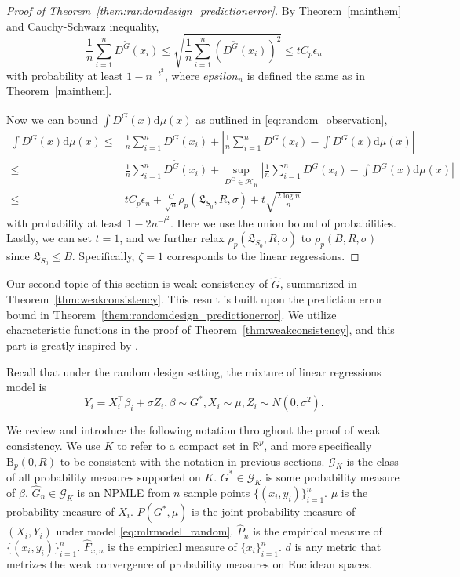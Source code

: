 \documentclass[11pt]{article}
\numberwithin{equation}{section}
\newcommand{\RS}{\mathbb{R}}
\newcommand{\T}{ \top }
\newcommand{\ball}{\mathrm{B}}
\newcommand{\errrd}{\rho}
\newcommand{\lipsz}{\mathfrak{L}}
\begin{document}
\begin{appendices}
\begin{proof}[Proof of Theorem~\ref{them:randomdesign_predictionerror}]
By Theorem~\ref{mainthem} and Cauchy-Schwarz inequality,
\begin{equation}
\frac{1}{n} \sum_{i=1}^nD^{\tilde{G}}(x_i) \leq \sqrt{\frac{1}{n} \sum_{i=1}^n(D^{\tilde{G}}(x_i))^2} \leq tC_p\epsilon_n
\label{eq:mainthm_sqrt}
\end{equation}
with probability at least $1-n^{-t^2}$, where $epsilon_n$ is defined the same as in Theorem~\ref{mainthem}.

Now we can bound $\int D^{\tilde{G}}(x) \mathrm{d} \mu(x)$ as outlined in \eqref{eq:random_observation},
\[
\begin{split}
\int D^{\tilde{G}}(x) \mathrm{d} \mu(x) \leq & \frac{1}{n} \sum_{i=1}^nD^{\tilde{G}}(x_i) + \left| \frac{1}{n} \sum_{i=1}^n D^{\tilde{G}}(x_i) - \int D^{\tilde{G}}(x) \mathrm{d} \mu(x)\right|\\
\leq  &\frac{1}{n} \sum_{i=1}^nD^{\tilde{G}}(x_i) + \sup_{D^G \in \mathcal{H}_R} \left| \frac{1}{n} \sum_{i=1}^n D^G(x_i) - \int D^G(x) \mathrm{d} \mu(x)\right|\\
\leq & t C_p \epsilon_n + \frac{C}{\sqrt{n}} \errrd_p(\lipsz_{S_0},R,\sigma) + t\sqrt{\frac{2\log n}{n}}
\end{split}
\]
with probability at least $1-2n^{-t^2}$. Here we use the union bound of probabilities. Lastly, we can set $t=1$, and we further relax  $\errrd_p(\lipsz_{S_0},R,\sigma)$ to  $\errrd_p(B,R,\sigma)$ since $\lipsz_{S_0} \leq B$. Specifically, $\zeta = 1$ corresponds to the linear regressions.
\end{proof}


Our second topic of this section is weak consistency of $\hat{G}$, summarized in Theorem~\ref{thm:weakconsistency}. This result is built upon the prediction error bound in Theorem~\ref{them:randomdesign_predictionerror}. We utilize characteristic functions in the proof of Theorem~\ref{thm:weakconsistency}, and this part is greatly inspired by \cite{beran1994minimum}.

Recall that under the random design setting, the mixture of linear regressions model is
\begin{equation}
Y_i = X_i^\T \beta_i + \sigma Z_i, \beta \sim G^*,X_i \sim \mu, Z_i\sim N(0,\sigma^2).
\label{eq:mlrmodel_random}
\end{equation}

We review and introduce the following notation throughout the proof of weak consistency. We use $K$ to refer to a compact set in $\RS^p$, and more specifically $\ball_p(0,R)$ to be consistent with the notation in previous sections. $\mathcal{G}_K$ is the class of all probability measures supported on $K$. $G^* \in \mathcal{G}_K$ is some probability measure of $\beta$. $\hat{G}_n \in \mathcal{G}_K$ is an NPMLE from $n$ sample points $\{ (x_i,y_i)\}_{i=1}^n$. $\mu$ is the probability measure of $X_i$. $P(G^*,\mu)$ is the joint probability measure of $(X_i,Y_i)$ under model \eqref{eq:mlrmodel_random}. $\hat{P}_n$ is the empirical measure of $\{ (x_i,y_i)\}_{i=1}^n$. $\hat{F}_{x,n}$ is the empirical measure of $\{ x_i\}_{i=1}^n$. $d$ is any metric that metrizes the weak convergence of probability measures on Euclidean spaces.


\end{appendices}
\end{document}
